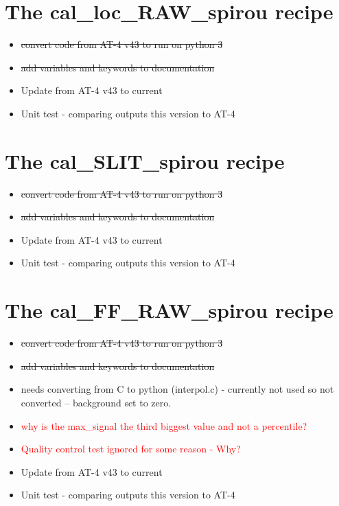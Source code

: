 \section{The cal\_loc\_RAW\_spirou recipe}
\label{ch:todo:cal_loc_RAW_spirou}

\begin{itemize}
	\item \sout{convert code from AT-4 v43 to run on python 3}
	\item \sout{add variables and keywords to documentation}
	\item Update from AT-4 v43 to current
	\item Unit test - comparing outputs this version to AT-4
\end{itemize}

\section{The cal\_SLIT\_spirou recipe}
\label{ch:todo:cal_SLIT_spirou}

\begin{itemize}
	\item \sout{convert code from AT-4 v43 to run on python 3}
	\item \sout{add variables and keywords to documentation}
	\item Update from AT-4 v43 to current
	\item Unit test - comparing outputs this version to AT-4
\end{itemize}

\section{The cal\_FF\_RAW\_spirou recipe}
\label{ch:todo:cal_FF_RAW_spirou}

\begin{itemize}
	\item \sout{convert code from AT-4 v43 to run on python 3}
	\item \sout{add variables and keywords to documentation}
	\item {} needs converting from C to python (interpol.c) - currently not used so not converted  -- background set to zero.
	\item \textcolor{red}{ why is the max\_signal the third biggest value and not a percentile?}
	\item \textcolor{red}{Quality control test  ignored for some reason - Why?}
	\item Update from AT-4 v43 to current
	\item Unit test - comparing outputs this version to AT-4
\end{itemize}

